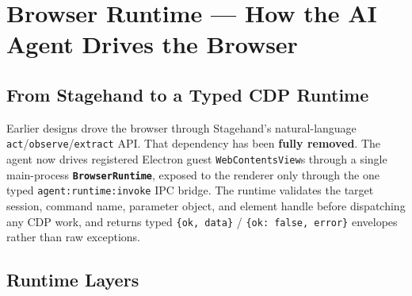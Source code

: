\documentclass[11pt,a4paper]{article}
\begin{document}
\section{Browser Runtime --- How the AI Agent Drives the Browser}
\label{sec:runtime}

\subsection{From Stagehand to a Typed CDP Runtime}
Earlier designs drove the browser through Stagehand's natural-language \texttt{act}/\texttt{observe}/\texttt{extract} API. That dependency has been \textbf{fully removed}. The agent now drives registered Electron guest \texttt{WebContentsView}s through a single main-process \textbf{\texttt{BrowserRuntime}}, exposed to the renderer only through the one typed \texttt{agent:runtime:invoke} IPC bridge. The runtime validates the target session, command name, parameter object, and element handle before dispatching any CDP work, and returns typed \texttt{\{ok, data\}} / \texttt{\{ok: false, error\}} envelopes rather than raw exceptions.

\subsection{Runtime Layers}
\end{document}
